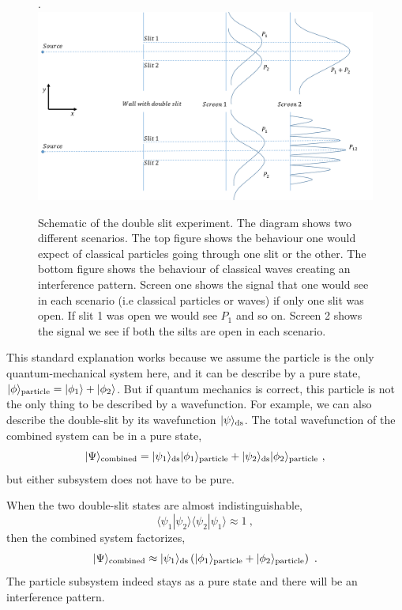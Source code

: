 \documentclass[aps,showpacs,onecolumn,floats,prd,superscriptaddress,nofootinbib]{revtex4-1}
\begin{document}
\begin{figure}[h!]
\begin{center}.
\includegraphics[scale = 0.5]{DSe.pdf}
\caption{Schematic of the double slit experiment. The diagram shows two different scenarios. The top figure shows the behaviour one would expect of classical particles going through one slit or the other. The bottom figure shows the behaviour of classical waves creating an interference pattern. Screen one shows the signal that one would see in each scenario (i.e classical particles or waves) if only one slit was open. If slit 1 was open we would see $P_1$ and so on. Screen 2 shows the signal we see if both the silts are open in each scenario.}
\label{fig-doubleslit}
\end{center}
\end{figure}

This standard explanation works because we assume the particle is the only quantum-mechanical system here, and it can be describe by a pure state, $|\phi\rangle_{\rm particle} = |\phi_1\rangle + |\phi_2\rangle$.
But if quantum mechanics is correct, this particle is not the only thing to be described by a wavefunction. 
For example, we can also describe the double-slit by its wavefunction $|\psi\rangle_{\rm ds}$. The total wavefunction of the combined system can be in a pure state,
\begin{equation}
|\Psi\rangle_{\rm combined} = |\psi_1\rangle_{\rm ds}|\phi_1\rangle_{\rm particle} 
+ |\psi_2\rangle_{\rm ds}|\phi_2\rangle_{\rm particle} ~,
\end{equation}
but either subsystem does not have to be pure.

When the two double-slit states are almost indistinguishable,
\begin{equation}
\langle\psi_1|\psi_2\rangle\langle\psi_2|\psi_1\rangle \approx 1~,
\label{eq-pure}
\end{equation}
then the combined system factorizes,
\begin{equation}
|\Psi\rangle_{\rm combined} \approx |\psi_1\rangle_{\rm ds}
\left(|\phi_1\rangle_{\rm particle} + |\phi_2\rangle_{\rm particle}\right) ~.
\end{equation}
The particle subsystem indeed stays as a pure state and there will be an interference pattern.
\end{document}
